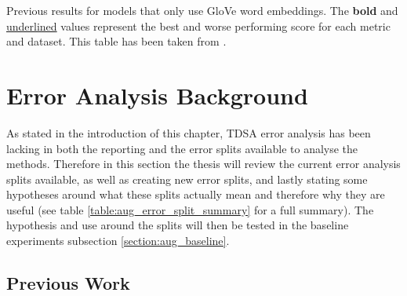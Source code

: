 \begin{table}[!h]
    \centering
    
    \caption{Previous results for models that only use GloVe word embeddings. The \textbf{bold} and \underline{underlined} values represent the best and worse performing score for each metric and dataset. This table has been taken from \citet{du-etal-2019-capsule}.}
    \label{tab:aug_previous_work_results}
\end{table}

\FloatBarrier
\section{Error Analysis Background}
\label{section:aug_error_analysis}
As stated in the introduction of this chapter, TDSA error analysis has been lacking in both the reporting and the error splits available to analyse the methods. Therefore in this section the thesis will review the current error analysis splits available, as well as creating new error splits, and lastly stating some hypotheses around what these splits actually mean and therefore why they are useful (see table \ref{table:aug_error_split_summary} for a full summary). The hypothesis and use around the splits will then be tested in the baseline experiments subsection \ref{section:aug_baseline}.

\FloatBarrier
\subsection{Previous Work}
\label{section:aug_error_analysis_previous_work}

